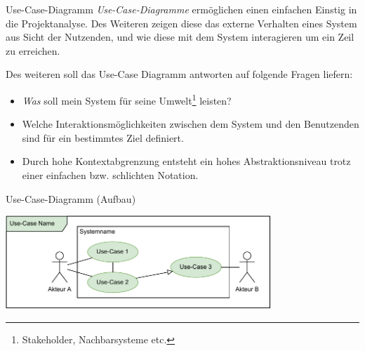 \begin{defi}{Use-Case-Diagramm}
    \emph{Use-Case-Diagramme} ermöglichen einen einfachen Einstig in die Projektanalyse.
    Des Weiteren zeigen diese das externe Verhalten eines System aus Sicht der Nutzenden, und wie diese mit dem System interagieren um ein Zeil zu erreichen.

    Des weiteren soll das Use-Case Diagramm antworten auf folgende Fragen liefern:
    \begin{itemize}
        \item \emph{Was} soll mein System für seine Umwelt\footnote{Stakeholder, Nachbarsysteme etc.} leisten?
        \item Welche Interaktionsmöglichkeiten zwischen dem System und den Benutzenden sind für ein bestimmtes Ziel definiert.
        \item Durch hohe Kontextabgrenzung entsteht ein hohes Abstraktionsniveau trotz einer einfachen bzw. schlichten Notation.
    \end{itemize}
\end{defi}

\begin{diag}{Use-Case-Diagramm (Aufbau)}
    \begin{center}
        \includegraphics[width=0.75\textwidth]{includes/figures/defi_diagrams_use_case_intro.pdf}
    \end{center}
\end{diag}

